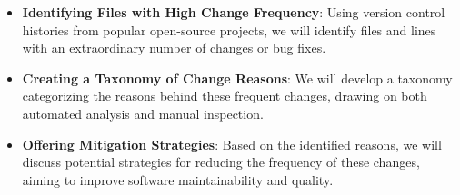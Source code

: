 \documentclass{article}
\begin{document}
\begin{itemize}

\item{\textbf{Identifying Files with High Change Frequency}: Using version control histories from popular open-source projects, we will identify files and lines with an extraordinary number of changes or bug fixes.}

\item{\textbf{Creating a Taxonomy of Change Reasons}: We will develop a taxonomy categorizing the reasons behind these frequent changes, drawing on both automated analysis and manual inspection.}

\item{\textbf{Offering Mitigation Strategies}: Based on the identified reasons, we will discuss potential strategies for reducing the frequency of these changes, aiming to improve software maintainability and quality.}
\end{itemize}



\end{document}

